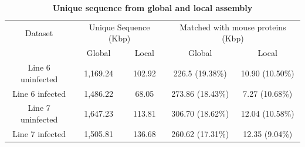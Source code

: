 \documentclass[10pt]{article}
\begin{document}
\begin{table}[!ht]
\caption{
\bf{Unique sequence from global and local assembly}}
\begin{tabular}{ccccc}
\hline
Dataset & \multicolumn{2}{c}{Unique Sequence (Kbp)} & \multicolumn{2}{c}{Matched with mouse proteins (Kbp)}\\
 & Global & Local & Global & Local\\
\hline
Line 6 uninfected & 1,169.24 & 102.92 & 226.5 (19.38\%) & 10.90 (10.50\%)\\
Line 6 infected & 1,486.22 & 68.05 & 273.86 (18.43\%)& 7.27 (10.68\%)\\
Line 7 uninfected & 1,647.23 & 113.81 & 306.70 (18.62\%) & 12.04 (10.58\%)\\
Line 7 infected & 1,505.81 & 136.68 & 260.62 (17.31\%)& 12.35 (9.04\%)\\
\hline
\end{tabular}
\label{unique_sequences_matched_mouse}
\end{table}
\end{document}
